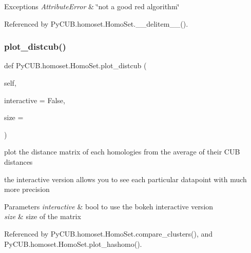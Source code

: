 \begin{DoxyExceptions}{Exceptions}
{\em Attribute\+Error} & \char`\"{}not a good red algorithm\char`\"{} \\
\hline
\end{DoxyExceptions}


Referenced by Py\+C\+U\+B.\+homoset.\+Homo\+Set.\+\_\+\+\_\+delitem\+\_\+\+\_\+().

\mbox{\label{class_py_c_u_b_1_1homoset_1_1_homo_set_aa385d8acea32381efae12c219c24a331}} 
\subsubsection{\texorpdfstring{plot\+\_\+distcub()}{plot\_distcub()}}
{\footnotesize\ttfamily def Py\+C\+U\+B.\+homoset.\+Homo\+Set.\+plot\+\_\+distcub (\begin{DoxyParamCaption}\item[{}]{self,  }\item[{}]{interactive = {\ttfamily False},  }\item[{}]{size = {} }\end{DoxyParamCaption})}



plot the distance matrix of each homologies from the average of their C\+UB distances 

the interactive version allows you to see each particular datapoint with much more precision


\begin{DoxyParams}{Parameters}
{\em interactive} & bool to use the bokeh interactive version \\
\hline
{\em size} & size of the matrix \\
\hline
\end{DoxyParams}


Referenced by Py\+C\+U\+B.\+homoset.\+Homo\+Set.\+compare\+\_\+clusters(), and Py\+C\+U\+B.\+homoset.\+Homo\+Set.\+plot\+\_\+hashomo().

\mbox{\label{class_py_c_u_b_1_1homoset_1_1_homo_set_a8ab62bae7be17abf4b13ad37d5c881eb}} 
